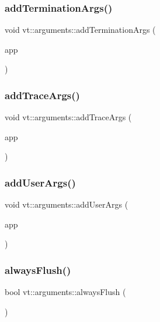 \subsubsection{\texorpdfstring{add\+Termination\+Args()}{addTerminationArgs()}}
{\footnotesize\ttfamily void vt\+::arguments\+::add\+Termination\+Args (\begin{DoxyParamCaption}\item[{C\+L\+I\+::\+App \&}]{app }\end{DoxyParamCaption})}

\mbox{\label{namespacevt_1_1arguments_a31bf3855abd5a792cb6c784858ef8b6c}} 
\subsubsection{\texorpdfstring{add\+Trace\+Args()}{addTraceArgs()}}
{\footnotesize\ttfamily void vt\+::arguments\+::add\+Trace\+Args (\begin{DoxyParamCaption}\item[{C\+L\+I\+::\+App \&}]{app }\end{DoxyParamCaption})}

\mbox{\label{namespacevt_1_1arguments_a1c50652e9209a72449953853975d4817}} 
\subsubsection{\texorpdfstring{add\+User\+Args()}{addUserArgs()}}
{\footnotesize\ttfamily void vt\+::arguments\+::add\+User\+Args (\begin{DoxyParamCaption}\item[{C\+L\+I\+::\+App \&}]{app }\end{DoxyParamCaption})}

\mbox{\label{namespacevt_1_1arguments_a6d542414122f93d1b7c6eaa04c3aadfb}} 
\subsubsection{\texorpdfstring{always\+Flush()}{alwaysFlush()}}
{\footnotesize\ttfamily bool vt\+::arguments\+::always\+Flush (\begin{DoxyParamCaption}{ }\end{DoxyParamCaption})\hspace{0.3cm}{\ttfamily [inline]}}

